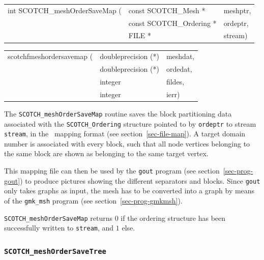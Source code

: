 \begin{itemize}
\progsyn

{\tt\begin{tabular}{l@{}ll}
int SCOTCH\_meshOrderSaveMap ( & const SCOTCH\_Mesh *     & meshptr, \\
                               & const SCOTCH\_Ordering * & ordeptr, \\
                               & FILE *                   & stream)
\end{tabular}}

{\tt\begin{tabular}{l@{}ll}
scotchfmeshordersavemap ( & doubleprecision (*) & meshdat, \\
                          & doubleprecision (*) & ordedat, \\
                          & integer             & fildes, \\
                          & integer             & ierr)
\end{tabular}}

\progdes

The {\tt SCOTCH\_meshOrderSaveMap} routine saves the block
partitioning data associated with the {\tt SCOTCH\_\lbt Ordering}
structure pointed to by {\tt ordeptr} to stream {\tt stream},
in the \scotch\ mapping format (see section~\ref{sec-file-map}).
A target domain number is associated with every block, such that
all node vertices belonging to the same block are shown as belonging
to the same target vertex.

This mapping file can then be used by the {\tt gout} program
(see section~\ref{sec-prog-gout}) to produce pictures showing
the different separators and blocks. Since {\tt gout} only takes
graphs as input, the mesh has to be converted into a graph by
means of the {\tt gmk\_\lbt msh} program (see
section~\ref{sec-prog-gmkmsh}).

\progret

{\tt SCOTCH\_meshOrderSaveMap} returns $0$ if the ordering structure
has been successfully written to {\tt stream}, and $1$ else.
\end{itemize}

\subsubsection{{\tt SCOTCH\_meshOrderSaveTree}}

